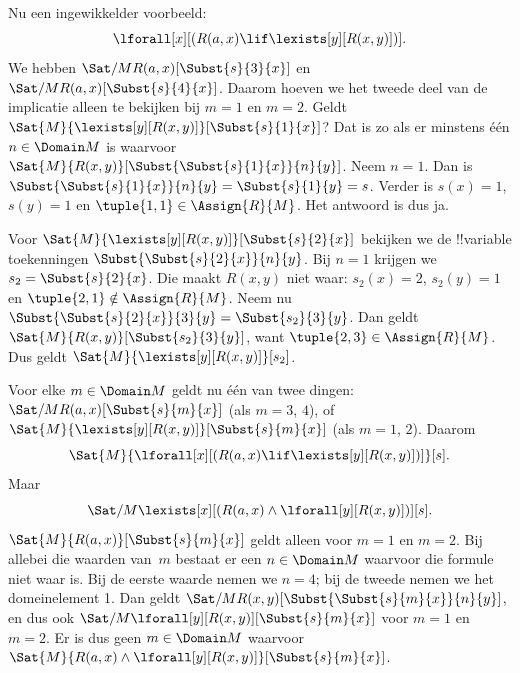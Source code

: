 \documentclass[openany]{memoir}
\begin{document}
\begin{ex}

Nu een ingewikkelder voorbeeld:
\[
\lforall[x][(R(a,x) \lif \lexists[y][R(x,y)])].
\]
We hebben $\Sat/{M}{R(a,x)}[\Subst{s}{3}{x}]$ en
$\Sat/{M}{R(a,x)}[\Subst{s}{4}{x}]$. Daarom hoeven we het tweede deel
van de implicatie alleen te bekijken bij $m = 1$ en $m = 2$. Geldt
$\Sat{M}{\lexists[y][R(x,y)]}[\Subst{s}{1}{x}]$? Dat is zo als er
minstens één $n \in \Domain M$ is waarvoor
$\Sat{M}{R(x,y)}[\Subst{\Subst{s}{1}{x}}{n}{y}]$. Neem $n = 1$.
Dan is $\Subst{\Subst{s}{1}{x}}{n}{y} = \Subst{s}{1}{y} = s$.
Verder is $s(x) = 1$, $s(y) = 1$ en $\tuple{1,1} \in \Assign{R}{M}$.
Het antwoord is dus ja.

Voor $\Sat{M}{\lexists[y][R(x,y)]}[\Subst{s}{2}{x}]$ bekijken we de
!!{variable} toekenningen $\Subst{\Subst{s}{2}{x}}{n}{y}$. Bij
$n = 1$ krijgen we~$s_2 = \Subst{s}{2}{x}$. Die maakt $R(x,y)$ niet
waar: $s_2(x) = 2$, $s_2(y) = 1$ en $\tuple{2,1}\notin \Assign{R}{M}$.
Neem nu $\Subst{\Subst{s}{2}{x}}{3}{y} = \Subst{s_2}{3}{y}$.
Dan geldt $\Sat{M}{R(x,y)}[\Subst{s_2}{3}{y}]$, want
$\tuple{2,3} \in \Assign{R}{M}$. Dus geldt
$\Sat{M}{\lexists[y][R(x,y)]}[s_2]$.

Voor elke $m \in \Domain M$ geldt nu één van twee dingen:
$\Sat/{M}{R(a,x)}[\Subst{s}{m}{x}]$ (als $m = 3$, $4$), of
$\Sat{M}{\lexists[y][R(x,y)]}[\Subst{s}{m}{x}]$ (als $m = 1$, $2$). Daarom
\[
\Sat{M}{\lforall[x][(R(a,x) \lif \lexists[y][R(x,y)])]}[s].
\]
Maar
\[
\Sat/{M}{\lexists[x][(R(a,x) \land \lforall[y][R(x,y)])]}[s].
\]
$\Sat{M}{R(a,x)}[\Subst{s}{m}{x}]$ geldt alleen voor $m = 1$ en $m =
2$. Bij allebei die waarden van~$m$ bestaat er een $n \in \Domain M$
waarvoor die formule niet waar is. Bij de eerste waarde nemen we $n = 4$;
bij de tweede nemen we het domeinelement 1. Dan geldt
$\Sat/{M}{R(x,y)}[\Subst{\Subst{s}{m}{x}}{n}{y}]$, en dus ook
$\Sat/{M}{\lforall[y][R(x,y)]}[\Subst{s}{m}{x}]$ voor $m = 1$ en $m =
2$. Er is dus geen $m \in \Domain M$ waarvoor
$\Sat{M}{R(a,x) \land \lforall[y][R(x,y)]}[\Subst{s}{m}{x}]$.
\end{ex}
\end{document}

